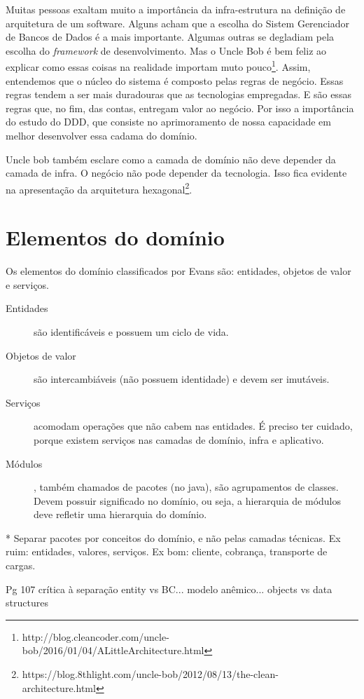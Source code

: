\documentclass[a4paper, 12pt]{article}
\begin{document}
Muitas pessoas exaltam muito a importância da infra-estrutura na definição de arquitetura de um software. Alguns acham que a escolha do Sistem Gerenciador de Bancos de Dados é a mais importante. Algumas outras se degladiam pela escolha do \emph{framework} de desenvolvimento. Mas o Uncle Bob é bem feliz ao explicar como essas coisas na realidade importam muto pouco\footnote{http://blog.cleancoder.com/uncle-bob/2016/01/04/ALittleArchitecture.html}. Assim, entendemos que o núcleo do sistema é composto pelas regras de negócio. Essas regras tendem a ser mais duradouras que as tecnologias empregadas. E são essas regras que, no fim, das contas, entregam valor ao negócio. Por isso a importância do estudo do DDD, que consiste no aprimoramento de nossa capacidade em melhor desenvolver essa cadama do domínio.

Uncle bob também esclare como a camada de domínio não deve depender da camada de infra. O negócio não pode depender da tecnologia. Isso fica evidente na apresentação da arquitetura hexagonal\footnote{https://blog.8thlight.com/uncle-bob/2012/08/13/the-clean-architecture.html}.

\section{Elementos do domínio}

Os elementos do domínio classificados por Evans são: entidades, objetos de valor e serviços.

\begin{description}
\item [Entidades] são identificáveis e possuem um ciclo de vida. 
\item [Objetos de valor] são intercambiáveis (não possuem identidade) e devem ser imutáveis.
\item [Serviços] acomodam operações que não cabem nas entidades. É preciso ter cuidado, porque existem serviços nas camadas de domínio, infra e aplicativo.
\item [Módulos], também chamados de pacotes (no java), são agrupamentos de classes. Devem possuir significado no domínio, ou seja, a hierarquia de módulos deve refletir uma hierarquia do domínio.
\end{description}

* Separar pacotes por conceitos do domínio, e não pelas camadas técnicas. Ex ruim: entidades, valores, serviços. Ex bom: cliente, cobrança, transporte de cargas.

Pg 107 crítica à separação entity vs BC... modelo anêmico... objects vs data structures
\end{document}
